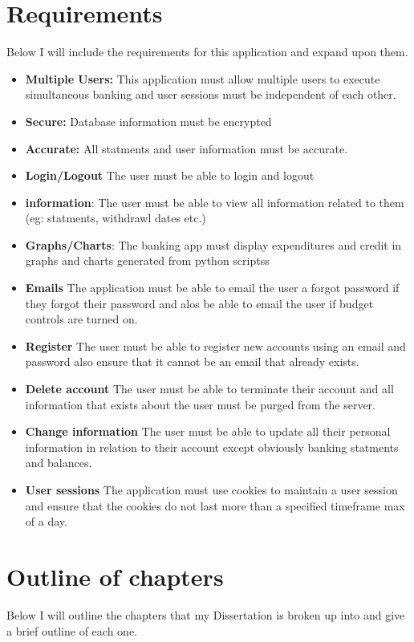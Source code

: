 \section{Requirements}
Below I will include the requirements for this application and expand upon them.
\begin{itemize}
\item \textbf{Multiple Users:} This application must allow multiple users to
execute simultaneous banking and user sessions must be independent of each
other.
\item \textbf{Secure:} Database information must be encrypted
\item \textbf{Accurate:} All statments and user information must be accurate.
\item \textbf{Login/Logout} The user must be able to login and logout
\item \textbf{information}: The user must be able to view all information related
to them (eg: statments, withdrawl dates etc.)
\item \textbf{Graphs/Charts}: The banking app must display expenditures and
credit in graphs and charts generated from python scriptss
\item \textbf{Emails} The application must be able to email the user a forgot
password if they forgot their password and alos be able to email the user if
budget controls are turned on.
\item \textbf{Register} The user must be able to register new accounts using
an email and password also ensure that it cannot be an email that already exists.
\item \textbf{Delete account} The user must be able to terminate their account
and all information that exists about the user must be purged from the server.
\item \textbf{Change information} The user must be able to update all their personal
information in relation to their account except obviously banking statments and
balances.
\item \textbf{User sessions} The application must use cookies to maintain a
user session and ensure that the cookies do not last more than a specified timeframe
max of a day.
\end{itemize}
\section{Outline of chapters}
Below I will outline the chapters that my Dissertation is broken up into and
give a brief outline of each one.
